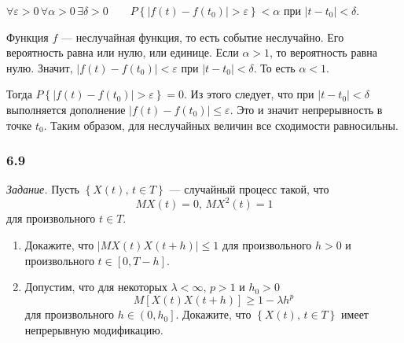 $ \forall \varepsilon > 0 \, \forall \alpha > 0 \, \exists \delta > 0 \qquad
  P \left\{ \left| f \left( t \right) - f \left( t_0 \right) \right| > \varepsilon \right\} <
  \alpha $
при $ \left| t - t_0 \right| < \delta $.

Функция $f$ --- неслучайная функция, то есть событие неслучайно.
Его вероятность равна или нулю, или единице.
Если $ \alpha > 1$, то вероятность равна нулю.
Значит, $ \left| f \left( t \right) - f \left( t_0 \right) \right| < \varepsilon $ при
$ \left| t - t_0 \right| <
  \delta $.
То есть $ \alpha < 1$.

Тогда
$P \left\{ \left| f \left( t \right) - f \left( t_0 \right) \right| > \varepsilon \right\} =
  0$.
Из этого следует, что при $ \left| t - t_0 \right| < \delta $ выполняется дополнение
$ \left| f \left( t \right) - f \left( t_0 \right) \right| \leq
  \varepsilon $.
Это и значит непрерывность в точке $t_0$.
Таким образом, для неслучайных величин все сходимости равносильны.

\subsubsection*{6.9}

\textit{Задание.}
Пусть $ \left\{ X \left( t \right), \, t \in T \right\} $ --- случайный процесс такой, что
$$MX \left( t \right) = 0, \,
  MX^2 \left( t \right) = 1$$
для произвольного $t \in T$.
\begin{enumerate}[label=\alph*)]
  \item Докажите, что $ \left| MX \left( t \right) X \left( t + h \right) \right| \leq 1$
  для произвольного $h > 0$ и произвольного $t \in \left[ 0, T - h \right] $.
  \item Допустим, что для некоторых $ \lambda < \infty, \, p > 1$ и $h_0 > 0$
  $$M \left[ X \left( t \right) X \left( t + h \right) \right] \geq
    1 - \lambda h^p$$
  для произвольного $h \in \left( 0, h_0 \right] $.
  Докажите, что $ \left\{ X \left( t \right), \, t \in T \right\} $ имеет непрерывную модификацию.
\end{enumerate}

